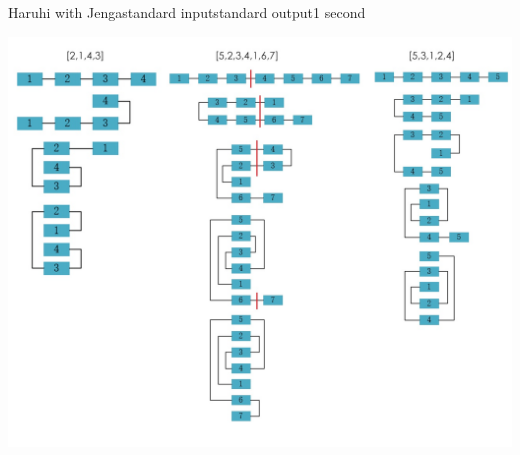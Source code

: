 \begin{problem}{Haruhi with Jenga}{standard input}{standard output}{1 second}
\Note
\begin{center}
\includegraphics[width=1\textwidth]{pics/J.jpg}
\end{center}

\end{problem}
